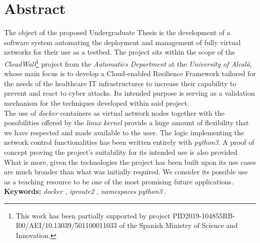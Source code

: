 \chapter{Abstract}
    \thispagestyle{empty}

    The object of the proposed Undergraduate Thesis is the development of a software system automating the deployment and management of fully virtual networks for their use as a testbed. The project sits within the scope of the \textit{CloudWall}\footnote{This work has been partially supported by project PID2019-104855RB-I00/AEI/10.13039/501100011033 of the Spanish Ministry of Science and Innovation.} project from the \textit{Automatics Department} at the \textit{University of Alcalá}, whose main focus is to develop a Cloud-enabled Resilience Framework tailored for the needs of the healthcare IT infrastructures to increase their capability to prevent and react to cyber attacks. Its intended purpose is serving as a validation mechanism for the techniques developed within said project.\\

    The use of \textit{docker} containers as virtual network nodes together with the possibilities offered by the \textit{linux kernel} provide a huge amount of flexibility that we have respected and made available to the user. The logic implementing the network control functionalities has been written entirely with \textit{python3}. A proof of concept proving the project's suitability for its intended use is also provided. What is more, given the technologies the project has been built upon its use cases are much broader than what was initially required. We consider its possible use as a teaching resource to be one of the most promising future applications.\\

    \textbf{Keywords:} \textit{docker} \cite{bib:docker}, \textit{iproute2} \cite{bib:man-ip}, \textit{namespaces} \cite{bib:man-namespaces} \textit{python3} \cite{bib:python}.
